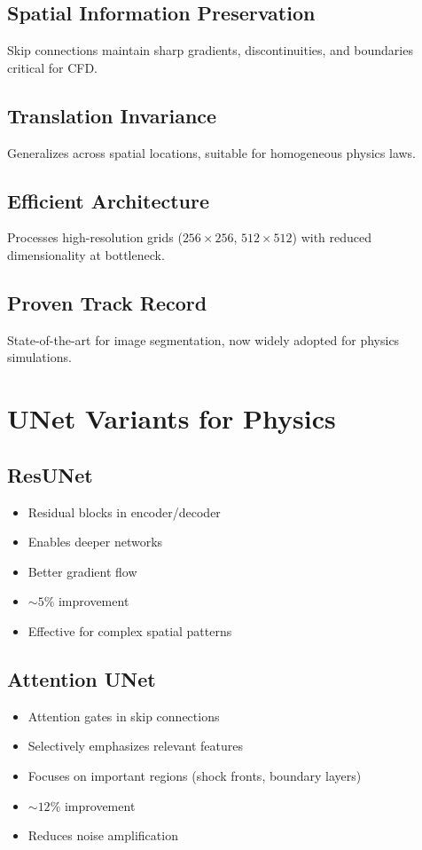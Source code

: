 \subsection{Spatial Information Preservation}
Skip connections maintain sharp gradients, discontinuities, and boundaries critical for CFD.

\subsection{Translation Invariance}
Generalizes across spatial locations, suitable for homogeneous physics laws.

\subsection{Efficient Architecture}
Processes high-resolution grids ($256 \times 256$, $512 \times 512$) with reduced dimensionality at bottleneck.

\subsection{Proven Track Record}
State-of-the-art for image segmentation, now widely adopted for physics simulations.

\section{UNet Variants for Physics}

\subsection{ResUNet}
\begin{itemize}
    \item Residual blocks in encoder/decoder
    \item Enables deeper networks
    \item Better gradient flow
    \item $\sim 5\%$ improvement
    \item Effective for complex spatial patterns
\end{itemize}

\subsection{Attention UNet}
\begin{itemize}
    \item Attention gates in skip connections
    \item Selectively emphasizes relevant features
    \item Focuses on important regions (shock fronts, boundary layers)
    \item $\sim 12\%$ improvement
    \item Reduces noise amplification
\end{itemize}

